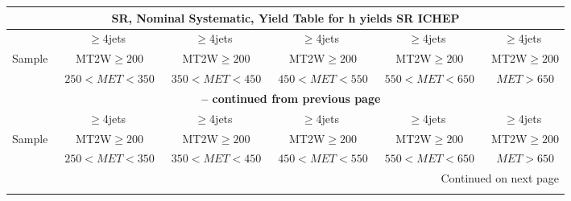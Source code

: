 \documentclass{article}
\begin{document}
 
 
 
 
\pagebreak 

 
 
 
 
\begin{longtable}{|l|c|c|c|c|c|} 
 
\multicolumn{6}{c}{ SR, Nominal Systematic, Yield Table for h yields SR ICHEP }\\* \hline 
  & $\ge$4jets  & $\ge$4jets  & $\ge$4jets  & $\ge$4jets  & $\ge$4jets \\* 
Sample  & ~MT2W$\ge200$  & ~MT2W$\ge200$  & ~MT2W$\ge200$  & ~MT2W$\ge200$  & ~MT2W$\ge200$ \\* 
  & ~$250<MET<350$  & ~$350<MET<450$  & ~$450<MET<550$  & ~$550<MET<650$  & ~$MET>650$ \\* 
\hline \hline 
\endfirsthead 
 
\multicolumn{6}{c}{{\bfseries \tablename\ \thetable{} -- continued from previous page}}\\* \hline 
  & $\ge$4jets  & $\ge$4jets  & $\ge$4jets  & $\ge$4jets  & $\ge$4jets \\* 
Sample  & ~MT2W$\ge200$  & ~MT2W$\ge200$  & ~MT2W$\ge200$  & ~MT2W$\ge200$  & ~MT2W$\ge200$ \\* 
  & ~$250<MET<350$  & ~$350<MET<450$  & ~$450<MET<550$  & ~$550<MET<650$  & ~$MET>650$ \\* 
\hline \hline 
\endhead 
 
\multicolumn{6}{|r|}{{Continued on next page}}\\* \hline 
\endfoot 
 
 
\endlastfoot 
 

\end{longtable}
\end{document}
